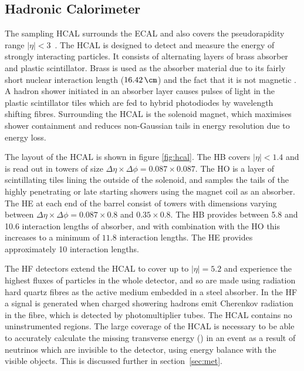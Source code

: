 \subsection{Hadronic Calorimeter}
\label{sec:hcal}

The sampling \ac{HCAL} surrounds the \ac{ECAL} and also
covers the pseudorapidity range $|\eta|<3$~\cite{Chatrchyan:2008aa}. The
\ac{HCAL} is designed to detect and measure the energy of strongly interacting
particles. It consists of alternating layers of brass absorber and plastic
scintillator. Brass is used as the absorber material due to its fairly short
nuclear interaction length ($16.42\,\cm$) and the fact that it is not magnetic
\cite{PDG}. A hadron shower initiated in an absorber layer causes pulses of 
light in the plastic scintillator tiles which are fed to hybrid photodiodes 
by wavelength shifting fibres. Surrounding the \ac{HCAL} is the solenoid magnet,
which maximises shower containment and reduces non-Gaussian tails in energy
resolution due to energy loss. 

The layout of the \ac{HCAL} is shown in figure \ref{fig:hcal}. The \ac{HB}
covers $|\eta|<1.4$ and is read out in towers of size
$\Delta\eta \times \Delta\phi = 0.087\times0.087$. The \ac{HO}
is a layer of scintillating tiles lining the outside of the solenoid, and
samples the tails of the highly penetrating or late starting showers using the magnet coil as an
absorber. The \ac{HE} at each end of the barrel
consist of towers with dimensions varying between $\Delta\eta \times \Delta\phi
= 0.087\times0.8$ and $0.35\times0.8$. The \ac{HB} provides between 5.8 and 10.6
interaction lengths of absorber, and with combination with the \ac{HO} this increases
to a minimum of $11.8$ interaction lengths. The \ac{HE} provides approximately
10 interaction lengths. 

The \ac{HF} detectors extend the \ac{HCAL} to cover up
to $|\eta|=5.2$ and experience the highest fluxes of particles in the whole
detector, and so are made using radiation hard quartz fibres as the active medium
embedded in a steel absorber. In the \ac{HF} a signal is generated when charged
showering hadrons emit Cherenkov radiation in the fibre, which is detected by
photomultiplier tubes. The \ac{HCAL} contains no
uninstrumented regions. The large coverage of the
\ac{HCAL} is necessary to be able to accurately calculate the missing transverse energy
(\MET) in an event as a result of neutrinos which are invisible to the detector,
using energy balance with the visible objects. This is discussed further in
section~\ref{sec:met}.


